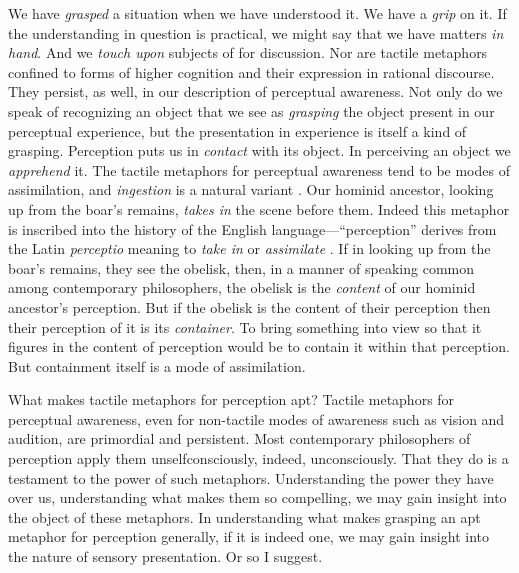 We have \emph{grasped} a situation when we have understood it. We have a \emph{grip} on it. If the understanding in question is practical, we might say that we have matters \emph{in hand}. And we \emph{touch upon} subjects of for discussion. Nor are tactile metaphors confined to forms of higher cognition and their expression in rational discourse. They persist, as well, in our description of perceptual awareness. Not only do we speak of recognizing an object that we see as \emph{grasping} the object present in our perceptual experience, but the presentation in experience is itself a kind of grasping. Perception puts us in \emph{contact} with its object. In perceiving an object we \emph{apprehend} it. The tactile metaphors for perceptual awareness tend to be modes of assimilation, and \emph{ingestion} is a natural variant \citep[see]{Johnston:2006uq,Price:1932fk}. Our hominid ancestor, looking up from the boar's remains, \emph{takes in} the scene before them. Indeed this metaphor is inscribed into the history of the English language---``perception'' derives from the Latin \emph{perceptio} meaning to \emph{take in} or \emph{assimilate} \citep[102]{Burnyeat:1979mv}. If in looking up from the boar's remains, they see the obelisk, then, in a manner of speaking common among contemporary philosophers, the obelisk is the \emph{content} of our hominid ancestor's perception. But if the obelisk is the content of their perception then their perception of it is its \emph{container}. To bring something into view so that it figures in the content of perception would be to contain it within that perception. But containment itself is a mode of assimilation. 

What makes tactile metaphors for perception apt? Tactile metaphors for perceptual awareness, even for non-tactile modes of awareness such as vision and audition, are primordial and persistent. Most contemporary philosophers of perception apply them unselfconsciously, indeed, unconsciously. That they do is a testament to the power of such metaphors. Understanding the power they have over us, understanding what makes them so compelling, we may gain insight into the object of these metaphors. In understanding what makes grasping an apt metaphor for perception generally, if it is indeed one, we may gain insight into the nature of sensory presentation. Or so I suggest.

